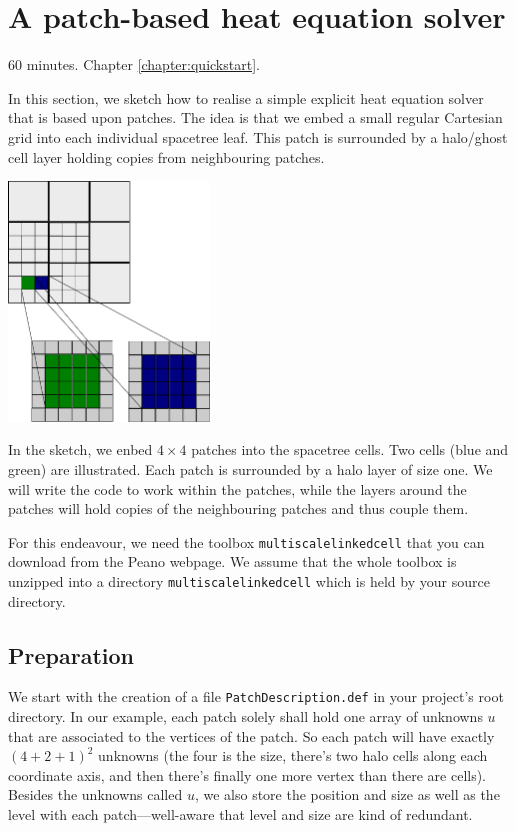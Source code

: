 \section{A patch-based heat equation solver}


\chapterDescription
  {
    60 minutes.
  }
  {
    Chapter \ref{chapter:quickstart}.
  }

In this section, we sketch how to realise a simple explicit heat equation
solver that is based upon patches.
The idea is that we embed a small regular Cartesian grid into each individual
spacetree leaf.
This patch is surrounded by a halo/ghost cell layer holding copies from
neighbouring patches.

\begin{center}
  \includegraphics[width=0.4\textwidth]{22_patched-based-solver/patches.pdf}
\end{center}

In the sketch, we enbed $4\times 4$ patches into the spacetree cells.
Two cells (blue and green) are illustrated.
Each patch is surrounded by a halo layer of size one.
We will write the code to work within the patches, while the layers around the
patches will hold copies of the neighbouring patches and thus couple them.

For this endeavour, we need the toolbox \texttt{multiscalelinkedcell} that you
can download from the Peano webpage.
We assume that the whole toolbox is unzipped into a directory
\texttt{multiscalelinkedcell} which is held by your source directory.


\subsection{Preparation}

We start with the creation of a file \texttt{PatchDescription.def} in your
project's root directory. 
In our example, each patch solely shall hold one array of unknowns $u$ that are
associated to the vertices of the patch.
So each patch will have exactly $(4+2+1)^2$ unknowns (the four is the size,
there's two halo cells along each coordinate axis, and then there's finally one
more vertex than there are cells).
Besides the unknowns called $u$, we also store the position and size as well as
the level with each patch---well-aware that level and size are kind of
redundant.

